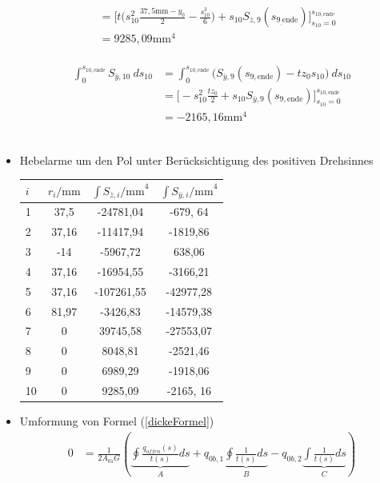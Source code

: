 \begin{itemize}
\begin{equation}
\begin{split}
			&=\bigg[t\bigg(s_{10}^2\frac{37,5\mathrm{mm}-y_0}{2}-\frac{s_{10}^3}{6}\bigg)+s_{10}S_{\bar z,9}(s_{9_,\mathrm{ende}})\bigg]_{s_{10}=0}^{s_{10,\mathrm{ende}}}\\\
			&=9285,09\mathrm{mm}^4
		\end{split}
	\end{equation}\\
	\begin{equation}
		\begin{split}
			\int_{0}^{s_{10,\mathrm{ende}}} S_{\bar y,10}\ ds_{10} &= \int_{0}^{s_{10,\mathrm{ende}}}\bigg(S_{\bar y,9}(s_{9,\mathrm{ende}})-tz_0s_{10}\bigg)\ ds_{10}\\\
			&=\bigg[-s_{10}^2\frac{tz_0}{2}+s_{10}S_{\bar y,9}(s_{9,\mathrm{ende}})\bigg]_{s_{10}=0}^{s_{10,\mathrm{ende}}}\\\
			&=-2165,16\mathrm{mm}^4
		\end{split}
	\end{equation}\\
\item Hebelarme um den Pol unter Berücksichtigung des positiven Drehsinnes
\begin{center}
\begin{tabular}[h]{l|c|c|c}
	$i$&$r_i\mathrm{/mm}$&$\int S_{\bar z,i}\mathrm{/mm}^4$&$\int S_{\bar y,i}\mathrm{/mm}^4$\\
	\hline
	1&37,5&-24781,04&-679, 64\\
	2&37,16&-11417,94&-1819,86\\
	3&-14&-5967,72&638,06\\
	4&37,16&-16954,55&-3166,21\\
	5&37,16&-107261,55&-42977,28\\
	6&81,97&-3426,83&-14579,38\\
	7&0&39745,58&-27553,07\\
	8&0&8048,81&-2521,46\\
	9&0&6989,29&-1918,06\\
	10&0&9285,09&-2165, 16\\
\end{tabular}
\end{center}
	\item Umformung von Formel (\ref{dickeFormel})
	\begin{equation}
		\begin{split}
			0 &= \frac{1}{2A_{01}G}(\underbrace{\oint\frac{q_{offen}(s)}{t(s)}ds}_A+q_{0b,1}\underbrace{\oint\frac{1}{t(s)}ds}_B-q_{0b,2}\underbrace{\int\frac{1}{t(s)}ds}_C)\\\

\end{split}
\end{equation}
\end{itemize}
